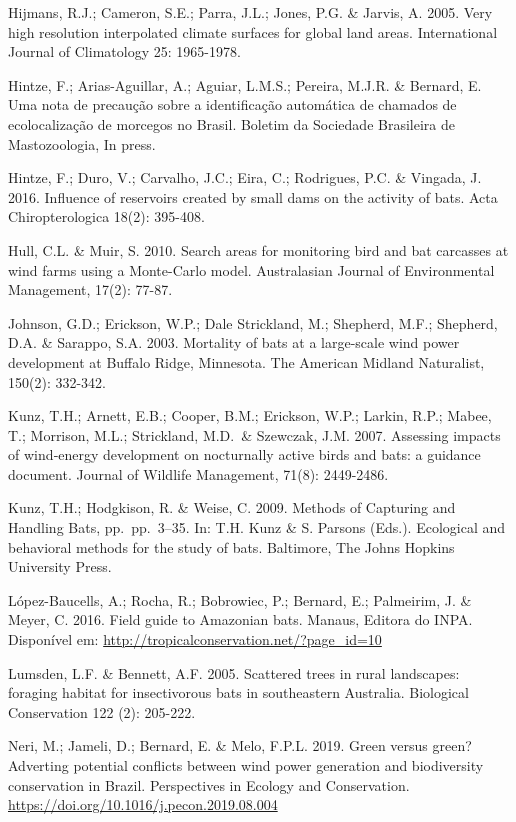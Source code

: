 \documentclass[
  oneside]{scrbook}
\begin{document}
Hijmans, R.J.; Cameron, S.E.; Parra, J.L.; Jones, P.G. \& Jarvis, A. 2005. Very high resolution interpolated climate surfaces for global land areas. International Journal of Climatology 25: 1965-1978.

Hintze, F.; Arias-Aguillar, A.; Aguiar, L.M.S.; Pereira, M.J.R. \& Bernard, E. Uma nota de precaução sobre a identificação automática de chamados de ecolocalização de morcegos no Brasil. Boletim da Sociedade Brasileira de Mastozoologia, In press.

Hintze, F.; Duro, V.; Carvalho, J.C.; Eira, C.; Rodrigues, P.C. \& Vingada, J. 2016. Influence of reservoirs created by small dams on the activity of bats. Acta Chiropterologica 18(2): 395-408.

Hull, C.L. \& Muir, S. 2010. Search areas for monitoring bird and bat carcasses at wind farms using a Monte-Carlo model. Australasian Journal of Environmental Management, 17(2): 77-87.

Johnson, G.D.; Erickson, W.P.; Dale Strickland, M.; Shepherd, M.F.; Shepherd, D.A. \& Sarappo, S.A. 2003. Mortality of bats at a large-scale wind power development at Buffalo Ridge, Minnesota. The American Midland Naturalist, 150(2): 332-342.

Kunz, T.H.; Arnett, E.B.; Cooper, B.M.; Erickson, W.P.; Larkin, R.P.; Mabee, T.; Morrison, M.L.; Strickland, M.D.~\& Szewczak, J.M. 2007. Assessing impacts of wind‐energy development on nocturnally active birds and bats: a guidance document. Journal of Wildlife Management, 71(8): 2449-2486.

Kunz, T.H.; Hodgkison, R. \& Weise, C. 2009. Methods of Capturing and Handling Bats, pp.~pp.~3--35. In: T.H. Kunz \& S. Parsons (Eds.). Ecological and behavioral methods for the study of bats. Baltimore, The Johns Hopkins University Press.

López-Baucells, A.; Rocha, R.; Bobrowiec, P.; Bernard, E.; Palmeirim, J. \& Meyer, C. 2016. Field guide to Amazonian bats. Manaus, Editora do INPA. Disponível em: \url{http://tropicalconservation.net/?page_id=10}

Lumsden, L.F. \& Bennett, A.F. 2005. Scattered trees in rural landscapes: foraging habitat for insectivorous bats in southeastern Australia. Biological Conservation 122 (2): 205-222.

Neri, M.; Jameli, D.; Bernard, E. \& Melo, F.P.L. 2019. Green versus green? Adverting potential conflicts between wind power generation and biodiversity conservation in Brazil. Perspectives in Ecology and Conservation. \url{https://doi.org/10.1016/j.pecon.2019.08.004}
\end{document}
